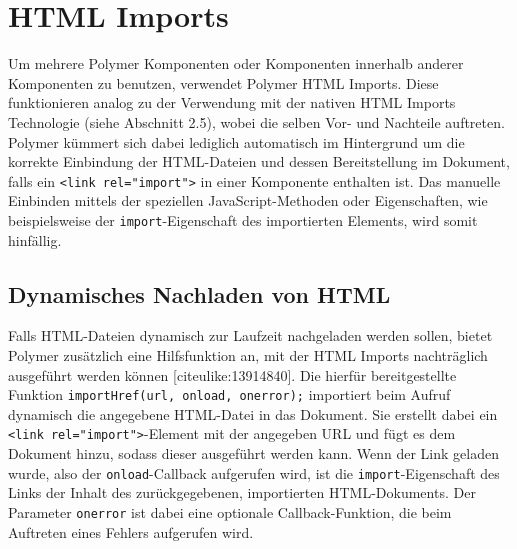 \begin{Shaded}
\begin{Highlighting}[]
\KeywordTok{>}
\KeywordTok{>}
    \KeywordTok{>}
  \NormalTok{(}\OperatorTok{\{}\OperatorTok{:} \OperatorTok{\}}\NormalTok{)}\OperatorTok{;<}
\OperatorTok{-}\OperatorTok{>}
\end{Highlighting}
\end{Shaded}

\section{HTML Imports}\label{html-imports}

Um mehrere Polymer Komponenten oder Komponenten innerhalb anderer
Komponenten zu benutzen, verwendet Polymer HTML Imports. Diese
funktionieren analog zu der Verwendung mit der nativen HTML Imports
Technologie (siehe Abschnitt 2.5), wobei die selben Vor- und Nachteile
auftreten. Polymer kümmert sich dabei lediglich automatisch im
Hintergrund um die korrekte Einbindung der HTML-Dateien und dessen
Bereitstellung im Dokument, falls ein
\texttt{\textless{}link\ rel="import"\textgreater{}} in einer Komponente
enthalten ist. Das manuelle Einbinden mittels der speziellen
JavaScript-Methoden oder Eigenschaften, wie beispielsweise der
\texttt{import}-Eigenschaft des importierten Elements, wird somit
hinfällig.

\subsection{Dynamisches Nachladen von
HTML}\label{dynamisches-nachladen-von-html}

Falls HTML-Dateien dynamisch zur Laufzeit nachgeladen werden sollen,
bietet Polymer zusätzlich eine Hilfsfunktion an, mit der HTML Imports
nachträglich ausgeführt werden können {[}citeulike:13914840{]}. Die
hierfür bereitgestellte Funktion
\texttt{importHref(url,\ onload,\ onerror);} importiert beim Aufruf
dynamisch die angegebene HTML-Datei in das Dokument. Sie erstellt dabei
ein \texttt{\textless{}link\ rel="import"\textgreater{}}-Element mit der
angegeben URL und fügt es dem Dokument hinzu, sodass dieser ausgeführt
werden kann. Wenn der Link geladen wurde, also der
\texttt{onload}-Callback aufgerufen wird, ist die
\texttt{import}-Eigenschaft des Links der Inhalt des zurückgegebenen,
importierten HTML-Dokuments. Der Parameter \texttt{onerror} ist dabei
eine optionale Callback-Funktion, die beim Auftreten eines Fehlers
aufgerufen wird.
